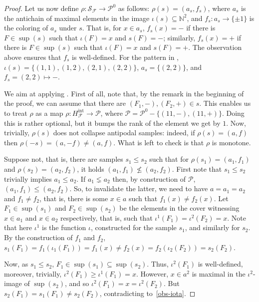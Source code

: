 \documentclass{article} %
\newcommand{\N}{\mathbb{N}}
\newcommand{\F}{\mathcal{F}}
\renewcommand{\S}{\mathcal{S}}
\newcommand{\PP}{\mathcal{P}}
\newcommand{\intr}{\mathrm{int}}
\begin{document}
\begin{proof}
	Let us now define $\rho \colon \S_\F \rightarrow \PP^0$ as follows: $\rho(s) = (a_s, f_s)$, where $a_s$ is the antichain of maximal elements in the image $\iota(s)\subseteq \N^2$, and $f_s \colon a_s\rightarrow \{\pm 1\}$ is the coloring of $a_s$ under $s$. That is, for $x \in a_s$, $f_s(x) = -$ if there is $F\in \sup(s)$ such that $\iota(F) = x$ and $s(F) = -$; similarly, $f_s(x) = +$ if there is $F\in \sup(s)$ such that $\iota(F) = x$ and $s(F) = +$. The observation above ensures that $f_s$ is well-defined. For the pattern in , $\iota(s) = \{(1,1), (1,2), (2,1), (2,2)\}$, $a_s = \{(2,2)\}$, and $f_s = (2,2) \mapsto -$. 
	
	We aim at applying . First of all, note that, by the remark in the beginning of the proof, we can assume that there are $(F_1, -), (F_2, +) \in s$. This enables us to treat $\rho$ as a map $\rho \colon H^\intr_\F \rightarrow \PP$, where $\PP = \PP^0 - \{(11, -), (11, +)\}$. Doing this is rather optional, but it bumps the rank of the element we get by $1$. Now, trivially, $\rho(s)$ does not collapse antipodal samples: indeed, if $\rho(s) = (a, f)$ then $\rho(-s) = (a, -f) \neq (a, f)$. What is left to check is that $\rho$ is monotone. 
	
	Suppose not, that is, there are samples $s_1 \leq s_2$ such that for $\rho(s_1) = (a_1, f_1)$ and $\rho(s_2) = (a_2, f_2)$, it holds $(a_1, f_1)\not\leq (a_2, f_2)$. First note that $s_1 \leq s_2$ trivially implies $a_1\leq a_2$. If $a_1\lneq a_2$ then, by construction of $\PP$, $(a_1, f_1)\leq (a_2, f_2)$. So, to invalidate the latter, we need to have $a = a_1 = a_2$ and $f_1 \neq f_2$, that is, there is some $x\in a$ such that $f_1(x) \neq f_2(x)$. Let $F_1 \in \sup(s_1)$ and $F_2\in \sup(s_2)$ be the elements in the cover witnessing $x\in a_1$ and $x\in a_2$ respectively, that is, such that $\iota^1(F_1) = \iota^2(F_2) = x$. Note that here $\iota^1$ is the function $\iota$, constructed for the sample $s_1$, and similarly for $s_2$. By the construction of $f_1$ and $f_2$, $s_1(F_1) = f_1(\iota_1(F_1)) = f_1(x) \neq f_2(x) = f_2(\iota_2(F_2)) = s_2(F_2)$.
	
	Now, as $s_1 \leq s_2$, $F_1 \in \sup(s_1)\subseteq \sup(s_2)$. Thus, $\iota^2(F_1)$ is well-defined, moreover, trivially, $\iota^2(F_1)\geq \iota^1(F_1) = x$. However, $x\in a^2$ is maximal in the $\iota^2$-image of $\sup (s_2)$, and so $\iota^2(F_1) = x = \iota^2(F_2)$. But $s_2(F_1) = s_1(F_1) \neq  s_2(F_2)$, contradicting to~\eqref{obs-iota}.	
	


\end{proof}
\end{document}
